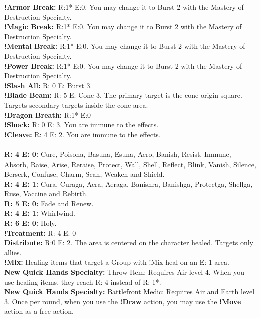 \textbf{!Armor Break:} R:1* E:0. You may change it to Burst 2 with the Mastery of Destruction Specialty.\\
\textbf{!Magic Break:} R:1* E:0. You may change it to Burst 2 with the Mastery of Destruction Specialty.\\
\textbf{!Mental Break:} R:1* E:0. You may change it to Burst 2 with the Mastery of Destruction Specialty.\\
\textbf{!Power Break:} R:1* E:0. You may change it to Burst 2 with the Mastery of Destruction Specialty.\\
\textbf{!Slash All:} R: 0 E: Burst 3.\\
\textbf{!Blade Beam:} R: 5 E: Cone 3. The primary target is the cone origin square. Targets secondary targets inside the cone area.\\
\textbf{!Dragon Breath:} R:1* E:0\\
\textbf{!Shock:} R: 0 E: 3. You are immune to the effects.\\
\textbf{!Cleave:} R: 4 E: 2. You are immune to the effects.
%
\\\\
%
 \ofrow
\textbf{R: 4 E: 0:} Cure, Poisona, Basuna, Esuna, Aero, Banish, Resist, Immune, Absorb, Raise, Arise, Reraise, Protect, Wall, Shell, Reflect, Blink, Vanish, Silence, Berserk, Confuse, Charm, Scan, Weaken and Shield.\\
\textbf{R: 4 E: 1:} Cura, Curaga, Aera, Aeraga, Banishra, Banishga, Protectga, Shellga, Ruse, Vaccine and Rebirth.\\
\textbf{R: 5 E: 0:} Fade and Renew.\\
\textbf{R: 4 E: 1:} Whirlwind.\\
\textbf{R: 6 E: 0:} Holy.
%
%
\pagebreak\\
%
%
 \ofrow
\textbf{!Treatment:} R: 4 E: 0\\
\textbf{Distribute:} R:0 E: 2. The area is centered on the character healed. Targets only allies.\\
\textbf{!Mix:} Healing items that target a Group with !Mix heal on an E: 1 area.\\
\textbf{New Quick Hands Specialty:} Throw Item: Requires Air level 4. When you use healing items, they reach R: 4 instead of R: 1*.\\
\textbf{New Quick Hands Specialty:} Battlefront Medic: Requires Air and Earth level 3. Once per round, when you use the \textbf{!Draw} action, you may use the \textbf{!Move} action as a free action.\\
